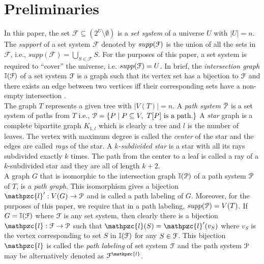 \documentclass[a4paper,UKenglish,numberwithinsect]{lipics}
\def\cF{{\cal F}}
\def\cP{{\cal P}}
\def\F{{\mathcal F}}
\def\bI{\mathbb I}
\def\cl{\mathpzc{l}}
\begin{document}

\section{Preliminaries} \label{sec:prelims} 
\noindent
In this paper, the set $\F \subseteq (2^{U} \setminus \emptyset)$ is a
{\em set system} of a universe $U$ with $|U| = n$. 
The {\em support} of a set system $\F$ denoted by  $supp(\cF)$ is the
union of all the sets in $\F$, i.e., $supp(\F) =
\bigcup_{S \in \F}S$.
For the purposes of this paper, a set system is required to ``cover'' the universe,
i.e. $ supp(\cF) = U$. In brief, the {\em intersection graph} $\bI(\cF)$ of a
set system $\cF$ is a graph such that its vertex set has a bijection
to $\cF$ and there exists an edge between two vertices iff their
corresponding sets have a non-empty
intersection \cite{mcg04}. \\
\noindent
The graph $T$ represents a given tree with $|V(T)| = n$. 
A {\em path system} $\cP$ is a set system of paths from
$T$ i.e., $\cP = \{P \mid P \subseteq V, \text{ } T[P]
\text{ is a path.} \}$
\noindent
A {\em star} graph is a complete bipartite graph
$K_{1,l}$ which is clearly a tree and $l$ is the number of leaves. The vertex with maximum degree is called the {\em center} of
the star and the edges are called {\em rays} of the star.
A {\em $k$-subdivided star} is a star with all its rays subdivided exactly
$k$ times. The path from the center to a leaf is called a ray of a
$k$-subdivided star and they are all of length $k+2$.\\
\noindent
A graph $G$ that is isomorphic to the intersection graph $\bI(\cP)$ of a
path system $\cP$ of $T$, is a {\em path graph}. This
isomorphism gives a bijection $\cl': V(G) \rightarrow \cP$ and is
called a path labeling of $G$. Moreover, for the purposes of this paper, we
require that in a path labeling, $supp(\cP) = V(T)$. 
If $G = \bI(\cF)$ where $\cF$ is any set system, then clearly there is
a bijection $\cl: \cF \rightarrow \cP$ such that $\cl(S) = \cl'(v_S)$
where $v_S$ is the vertex corresponding to set $S$ in $\bI(\cF)$ for
any $S \in \cF$. 
This bijection $\cl$ is called the {\em path labeling} of set system
$\cF$ and the path system $\cP$ may be alternatively denoted as
$\cF^\cl$. 
 
\end{document}
